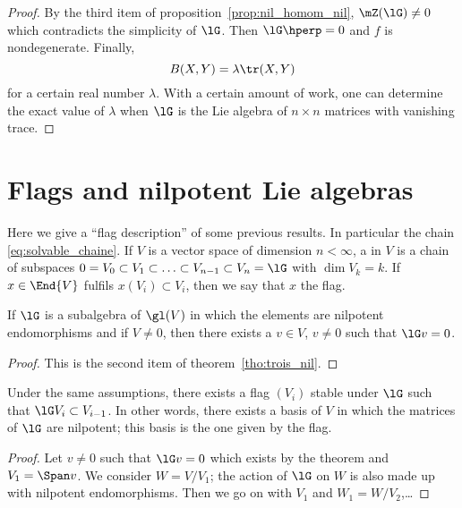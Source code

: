 \begin{proof}
	By the third item of proposition~\ref{prop:nil_homom_nil}, $\mZ(\lG)\neq 0$ which contradicts the simplicity of $\lG$. Then $\lG\hperp=0$ and $f$ is nondegenerate. Finally,
	\begin{equation}
		B(X,Y)=\lambda\tr(X,Y)
	\end{equation}
	for a certain real number $\lambda$. With a certain amount of work, one can determine the exact value of $\lambda$ when $\lG$ is the Lie algebra of $n\times n$ matrices with vanishing trace.
\end{proof}

\section{Flags and nilpotent Lie algebras}

Here we give a ``flag description'' of some previous results. In particular the chain \eqref{eq:solvable_chaine}. If $V$ is a vector space of dimension $n<\infty$, a  in $V$ is a chain of subspaces $0=V_0\subset V_1\subset\ldots\subset V_{n-1}\subset V_n=\lG$ with $\dim V_k=k$. If $x\in\End{V}$ fulfils $x(V_i)\subset V_i$, then we say that $x$  the flag.

\begin{theorem}
	If $\lG$ is a subalgebra of $\gl(V)$ in which the elements are nilpotent endomorphisms and if $V\neq 0$, then there exists a $v\in V$, $v\neq 0$ such that $\lG v=0$.
\end{theorem}

\begin{proof}
	This is the second item of theorem~\ref{tho:trois_nil}.
\end{proof}

\begin{corollary}
	Under the same assumptions, there exists a flag $(V_i)$ stable under $\lG$ such that $\lG V_i\subset V_{i-1}$. In other words, there exists a basis of $V$ in which the matrices of $\lG$ are nilpotent; this basis is the one given by the flag.
\end{corollary}

\begin{proof}
	Let $v\neq 0$ such that $\lG v=0$ which exists by the theorem and $V_1=\Span v$. We consider $W=V/V_1$; the action of $\lG$ on $W$ is also made up with nilpotent endomorphisms. Then we go on with $V_1$ and $W_1=W/V_2$,\dots
\end{proof}


